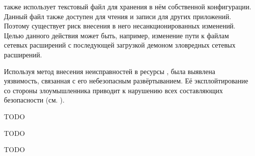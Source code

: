 %
\PeerHood также использует текстовый файл для хранения в нём собственной конфигурации. 
%
Данный файл также доступен для чтения и записи для других приложений. 
%
Поэтому существует риск внесения в него несанкционированных изменений. 
%
Целью данного действия может быть, например, изменение пути к файлам сетевых расширений с последующей загрузкой демоном зловредных сетевых расширений.

%
Используя метод внесения неисправностей в ресурсы \PeerHood, была выявлена уязвимость, связанная с его небезопасным развёртыванием. 
%
Её эксплойтирование со стороны злоумышленника приводит к нарушению всех составляющих безопасности \PeerHood (см. ).


%
TODO
%
\begin{comment}
На что направлена ревизия
Как она будет происходит
Какие результаты необходимо получить
Что они дадут (связь с задачами анализа)

Анализ кода с точки зрения безопасности
Методы тестирования — лишь дополнительный инструмент
Более глубокий поиск уязвимостей
\end{comment}

%
TODO
%
\begin{comment}
Язык разработки С++: переполнение буфера, целочисленные данные, форматные строки, указатели
Apple Secure Coding Guide: помимо перечисленных выше ещё проверка входных данных, состояние гонки, IPC, файловая система, проблемы контроля доступа
C Secure Coding Standard: препроцессор, инициализация, целочисленные данные, массивы, строки, распределение памяти, ввод/вывод, временные файлы, окружение, сигналы
Seven Pernicious Kingdoms: проверка входных данных, неправильное использование API, механизм безопасности, проблема синхронизации, неправильная обработка исключительных ситуаций, нарушение инкапсуляции (раскрытие информации), программное окружение
Подведение итогов: выжимка из перечисленных выше списков
\end{comment}

%
TODO
%
\begin{comment}
Уязвимости, характерные для С++, будут проверены с помощью ревизии кода
Проверка входных данных, в каких местах: с помощью ревизии кода
Необходима проверка API: ревизия кода
Состояния гонки с помощью инструментальных средств, а примитивы синхронизации с помощью ревизии кода
Чек-лист из C Secure Coding Standard по списку с помощью ревизии кода
Программное окружение: с помощью ревизии кода + анализ Qt
Раскрытие информации: с помощью ревизии кода
Неправильная обработка исключений: ревизия кода

Проверка точек входа приложения
\end{comment}

